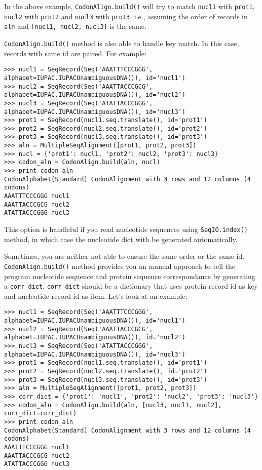 In the above example, \verb|CodonAlign.build()| will try to match
\texttt{nucl1} with \texttt{prot1}, \texttt{nucl2} with \texttt{prot2}
and \texttt{nucl3} with \texttt{prot3}, i.e., assuming the order of
records in \texttt{aln} and \texttt{{[}nucl1, nucl2, nucl3{]}} is the
same.

\verb|CodonAlign.build()| method is also able to handle key match. In
this case, records with same id are paired. For example:

\begin{verbatim}
>>> nucl1 = SeqRecord(Seq('AAATTTCCCGGG', alphabet=IUPAC.IUPACUnambiguousDNA()), id='nucl1')
>>> nucl2 = SeqRecord(Seq('AAATTACCCGCG', alphabet=IUPAC.IUPACUnambiguousDNA()), id='nucl2')
>>> nucl3 = SeqRecord(Seq('ATATTACCCGGG', alphabet=IUPAC.IUPACUnambiguousDNA()), id='nucl3')
>>> prot1 = SeqRecord(nucl1.seq.translate(), id='prot1')
>>> prot2 = SeqRecord(nucl2.seq.translate(), id='prot2')
>>> prot3 = SeqRecord(nucl3.seq.translate(), id='prot3')
>>> aln = MultipleSeqAlignment([prot1, prot2, prot3])
>>> nucl = {'prot1': nucl1, 'prot2': nucl2, 'prot3': nucl3}
>>> codon_aln = CodonAlign.build(aln, nucl)
>>> print codon_aln
CodonAlphabet(Standard) CodonAlignment with 3 rows and 12 columns (4 codons)
AAATTTCCCGGG nucl1
AAATTACCCGCG nucl2
ATATTACCCGGG nucl3
\end{verbatim}

This option is handleful if you read nucleotide sequences using
\verb|SeqIO.index()| method, in which case the nucleotide dict with be
generated automatically.

Sometimes, you are neither not able to ensure the same order or the same
id. \verb|CodonAlign.build()| method provides you an manual approach to
tell the program nucleotide sequence and protein sequence correspondance
by generating a \texttt{corr\_dict}. \texttt{corr\_dict} should be a
dictionary that uses protein record id as key and nucleotide record id
as item. Let's look at an example:

\begin{verbatim}
>>> nucl1 = SeqRecord(Seq('AAATTTCCCGGG', alphabet=IUPAC.IUPACUnambiguousDNA()), id='nucl1')
>>> nucl2 = SeqRecord(Seq('AAATTACCCGCG', alphabet=IUPAC.IUPACUnambiguousDNA()), id='nucl2')
>>> nucl3 = SeqRecord(Seq('ATATTACCCGGG', alphabet=IUPAC.IUPACUnambiguousDNA()), id='nucl3')
>>> prot1 = SeqRecord(nucl1.seq.translate(), id='prot1')
>>> prot2 = SeqRecord(nucl2.seq.translate(), id='prot2')
>>> prot3 = SeqRecord(nucl3.seq.translate(), id='prot3')
>>> aln = MultipleSeqAlignment([prot1, prot2, prot3])
>>> corr_dict = {'prot1': 'nucl1', 'prot2': 'nucl2', 'prot3': 'nucl3'}
>>> codon_aln = CodonAlign.build(aln, [nucl3, nucl1, nucl2], corr_dict=corr_dict)
>>> print codon_aln
CodonAlphabet(Standard) CodonAlignment with 3 rows and 12 columns (4 codons)
AAATTTCCCGGG nucl1
AAATTACCCGCG nucl2
ATATTACCCGGG nucl3
\end{verbatim}

